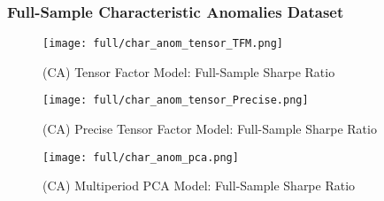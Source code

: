 \subsubsection{Full-Sample Characteristic Anomalies Dataset}

\begin{figure}[H]
    \centering
    \texttt{[image: full/char\_anom\_tensor\_TFM.png]}
    \caption{(CA) Tensor Factor Model: Full-Sample Sharpe Ratio}
    \label{fig:char_anom-primary-tfm}
\end{figure}

\begin{figure}[H]
    \centering
    \texttt{[image: full/char\_anom\_tensor\_Precise.png]}
    \caption{(CA) Precise Tensor Factor Model: Full-Sample Sharpe Ratio}
    \label{fig:char_anom-primary-precise}
\end{figure}


\begin{figure}[H]
    \centering
    \texttt{[image: full/char\_anom\_pca.png]}
    \caption{(CA) Multiperiod PCA Model: Full-Sample Sharpe Ratio}
    \label{fig:char_anom-primary-pca}
\end{figure}

